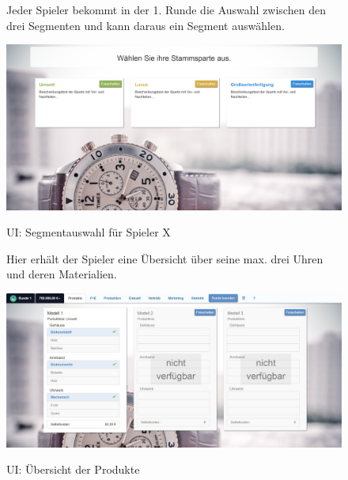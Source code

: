 \begin{figure} [!h]
\begin{minipage}{\textwidth}
Jeder Spieler bekommt in der 1. Runde die Auswahl zwischen den drei Segmenten und kann daraus ein Segment auswählen.\\
\end{minipage}
	\centering
	\includegraphics[scale=0.1]{img/bilder_layout/Spiel2.jpg}
	\label{fig:abb14}
	\caption{UI: Segmentauswahl für Spieler X} 
\end{figure}

\begin{figure}
\begin{minipage}{\textwidth}
Hier erhält der Spieler eine Übersicht über seine max. drei Uhren und deren Materialien.\\
\end{minipage}
	\centering
	\includegraphics[scale=0.3]{img/bilder_layout/produkte.jpeg}
	\label{fig:abb15}
	\caption{UI: Übersicht der Produkte}  
\end{figure}

